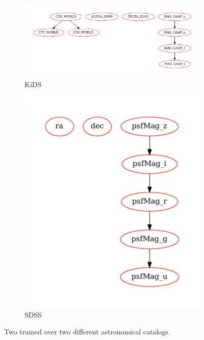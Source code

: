 \begin{figure}[htpb]
    \centering
    \begin{subfigure}[]{\textwidth}
    \includegraphics[width=\textwidth]{images/A2_prototypes/png_kids.pdf}
    \caption{\gls{KiDS}}
    \end{subfigure}
    \begin{subfigure}[]{0.5\textwidth}
    \includegraphics[width=\textwidth]{images/A2_prototypes/png_sdss.pdf}
    \caption{\gls{SDSS}}
    \end{subfigure}
    \caption{Two  trained over two different astronomical catalogs.}
    \label{fig:bayes1}
\end{figure}

